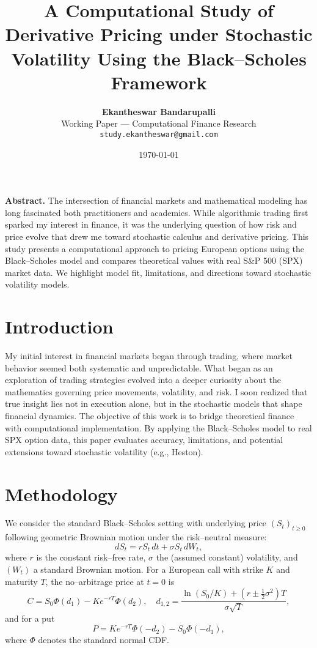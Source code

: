 \documentclass[12pt]{article}
\title{\textbf{A Computational Study of Derivative Pricing under Stochastic Volatility Using the Black--Scholes Framework}}
\author{\textbf{Ekantheswar Bandarupalli}\\
\small Working Paper --- Computational Finance Research\\
\small \texttt{study.ekantheswar@gmail.com}}
\date{\today}
\begin{document}
\maketitle
\thispagestyle{empty}
\vspace{1em}
\noindent\textbf{Abstract. }
The intersection of financial markets and mathematical modeling has long fascinated both practitioners and academics.
While algorithmic trading first sparked my interest in finance, it was the underlying question of how risk and price evolve
that drew me toward stochastic calculus and derivative pricing. This study presents a computational approach to pricing European options
using the Black--Scholes model and compares theoretical values with real S\&P 500 (SPX) market data. We highlight model fit, limitations,
and directions toward stochastic volatility models.

\newpage
\setcounter{page}{1}
\section{Introduction}
My initial interest in financial markets began through trading, where market behavior seemed both systematic and unpredictable.
What began as an exploration of trading strategies evolved into a deeper curiosity about the mathematics governing price movements,
volatility, and risk. I soon realized that true insight lies not in execution alone, but in the stochastic models that shape financial dynamics.
The objective of this work is to bridge theoretical finance with computational implementation.
By applying the Black--Scholes model to real SPX option data, this paper evaluates accuracy, limitations, and potential extensions
toward stochastic volatility (e.g., Heston).

\section{Methodology}
We consider the standard Black--Scholes setting with underlying price $(S_t)_{t\ge 0}$ following geometric Brownian motion under the risk--neutral measure:
\begin{equation}
dS_t = r S_t\,dt + \sigma S_t\, dW_t,
\end{equation}
where $r$ is the constant risk--free rate, $\sigma$ the (assumed constant) volatility, and $(W_t)$ a standard Brownian motion.
For a European call with strike $K$ and maturity $T$, the no--arbitrage price at $t=0$ is
\begin{equation}
C = S_0 \Phi(d_1) - K e^{-rT} \Phi(d_2), \quad
d_{1,2} = \frac{\ln(S_0/K) + (r \pm \tfrac{1}{2}\sigma^2)T}{\sigma\sqrt{T}},
\end{equation}
and for a put
\begin{equation}
P = K e^{-rT} \Phi(-d_2) - S_0 \Phi(-d_1),
\end{equation}
where $\Phi$ denotes the standard normal CDF.
\end{document}
